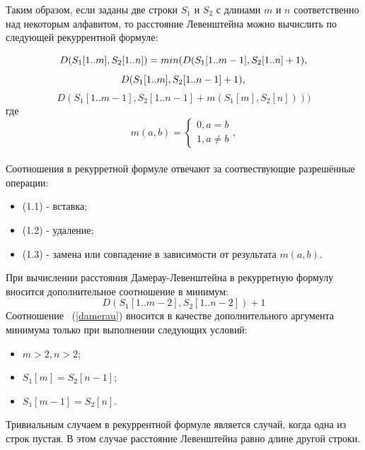 \documentclass[12pt]{report}
\begin{document}
	Таким образом, если заданы две строки $S_{1}$ и $S_{2}$ с длинами $m$ и $n$ соответственно над некоторым алфавитом, то расстояние Левенштейна можно вычислить по следующей рекуррентной формуле:

	\begin{equation}
	D(S_{1}[1..m], S_{2}[1..n]) = min(D(S_{1}[1..m-1], S_{2}[1..n] + 1),\\
	\end{equation}
	\begin{equation}
	D(S_{1}[1..m], S_{2}[1..n-1]+1),\\
	\end{equation}
	\begin{equation}
	D(S_{1}[1..m-1], S_{2}[1..n-1]+m(S_{1}[m], S_{2}[n])))
	\end{equation}
	где
	\begin{displaymath}
	m(a,b) = \left\{
	\begin{array}{ll}
		0, a=b\\
		1, a \neq b
	\end{array} \right.,
	\end{displaymath}\ \\
	Соотношения в рекурретной формуле отвечают за соотвествующие разрешённые операции:
	\begin{itemize}
		\item (1.1) - вставка;
		\item (1.2) - удаление;
		\item (1.3) - замена или совпадение в зависимости от результата $m(a,b)$.	
	\end{itemize}

	При вычислении расстояния Дамерау-Левенштейна в рекурретную формулу вносится дополнительное соотношение в минимум:
	\begin{equation}
	\label{damerau}
	D(S_{1}[1..m-2], S_{2}[1..n-2])+1
	\end{equation}
Соотношение ~(\ref{damerau}) вносится в качестве дополнительного аргумента минимума только при выполнении следующих условий:
	\begin{itemize}
		\item $m > 2,n > 2$;
		\item $S_{1}[m] = S_{2}[n-1]$;
		\item $S_{1}[m-1] = S_{2}[n]$.	
	\end{itemize}

	Тривиальным случаем в рекуррентной формуле является случай, когда одна из строк пустая. В этом случае расстояние Левенштейна равно длине другой строки.
\end{document}
